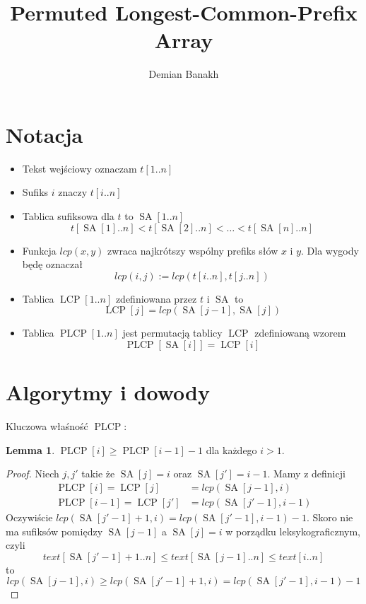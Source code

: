 \documentclass[a4paper,12pt]{article}
\title{Permuted Longest-Common-Prefix Array}
\author{Demian Banakh}
\date{}
\theoremstyle{definition}
\newtheorem{lemma}{Lemma}[section]
\DeclareMathOperator{\SA}{SA}
\DeclareMathOperator{\LCP}{LCP}
\DeclareMathOperator{\PLCP}{PLCP}
\begin{document}
\maketitle

\section{Notacja}

\begin{itemize}
\item Tekst wejściowy oznaczam $t[1..n]$
\item Sufiks $i$ znaczy $t[i..n]$
\item Tablica sufiksowa dla $t$ to $\SA[1..n]$
\[
t[\SA[1]..n] < t[\SA[2]..n] < \dots < t[\SA[n]..n]
\]
\item Funkcja $lcp(x, y)$ zwraca najkrótszy wspólny prefiks słów $x$ i $y$. Dla wygody będę oznaczał
\[
lcp(i, j) := lcp(t[i..n], t[j..n])
\]
\item Tablica $\LCP[1..n]$ zdefiniowana przez $t$ i $\SA$ to
\[
\LCP[j] = lcp(\SA[j - 1], \SA[j])
\]
\item Tablica $\PLCP[1..n]$ jest permutacją tablicy $\LCP$ zdefiniowaną wzorem
\begin{equation*}
\PLCP[\SA[i]] = \LCP[i]
\end{equation*}
\end{itemize}

\section{Algorytmy i dowody}

Kluczowa właśność $\PLCP$:
\begin{lemma}
$\PLCP[i] \ge \PLCP[i - 1] - 1$ dla każdego $i > 1$.
\begin{proof}
Niech $j, j'$ takie że $\SA[j] = i$ oraz $\SA[j'] = i - 1$. Mamy z definicji
\begin{align*}
\PLCP[i] = \LCP[j] &= lcp(\SA[j - 1], i) \\
\PLCP[i - 1] = \LCP[j'] &= lcp(\SA[j' - 1], i - 1)
\end{align*}
Oczywiście $lcp(\SA[j' - 1]+1, i) = lcp(\SA[j' - 1], i - 1) - 1$. Skoro nie ma sufiksów pomiędzy $\SA[j - 1]$ a $\SA[j]=i$ w porządku leksykograficznym, czyli
\[
text[\SA[j' - 1] + 1..n] \le text[\SA[j - 1]..n] \le text[i..n]
\]
to
\[
lcp(\SA[j - 1], i) \ge lcp(\SA[j' - 1] + 1, i) = lcp(\SA[j' - 1], i - 1) - 1
\]
\end{proof}
\end{lemma}
\end{document}
